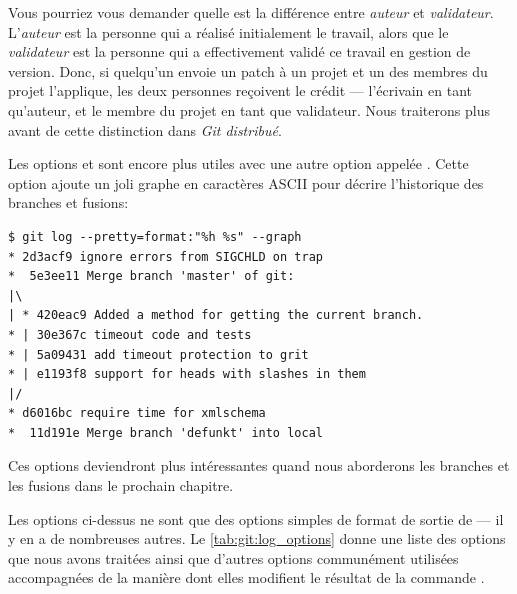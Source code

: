 Vous pourriez vous demander quelle est la différence entre \emph{auteur}  et \emph{validateur}.
L'\emph{auteur} est la personne qui a réalisé initialement le travail, alors que le \emph{validateur} est la personne qui a effectivement validé ce travail en gestion de version.
Donc, si quelqu'un envoie un patch à un projet et un des membres du projet l'applique, les deux personnes reçoivent le crédit --- l'écrivain en tant qu'auteur, et le membre du projet en tant que validateur.
Nous traiterons plus avant de cette distinction dans \emph{Git distribué}.

Les options  et  sont encore plus utiles avec une autre option  appelée .
Cette option ajoute un joli graphe en caractères ASCII pour décrire l'historique des branches et fusions:
\begin{Schunk}
\begin{Verbatim}
$ git log --pretty=format:"%h %s" --graph
* 2d3acf9 ignore errors from SIGCHLD on trap
*  5e3ee11 Merge branch 'master' of git:
|\
| * 420eac9 Added a method for getting the current branch.
* | 30e367c timeout code and tests
* | 5a09431 add timeout protection to grit
* | e1193f8 support for heads with slashes in them
|/
* d6016bc require time for xmlschema
*  11d191e Merge branch 'defunkt' into local
\end{Verbatim}
\end{Schunk}

Ces options deviendront plus intéressantes quand nous aborderons les branches et les fusions dans le prochain chapitre.

Les options ci-dessus ne sont que des options simples de format de sortie de  --- il y en a de nombreuses autres.
Le \autoref{tab:git:log_options} donne une liste des options que nous avons traitées ainsi que d'autres options communément utilisées accompagnées de la manière dont elles modifient le résultat de la commande .

